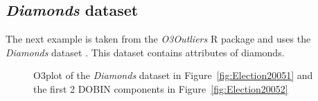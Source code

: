 \documentclass[a4paper,11pt]{article}
\begin{document}
\subsection{\textit{Diamonds} dataset}\label{sec:ResWithVis2}
The next example is taken from the \textit{O3Outliers} R package \citep{O3Rpack} and uses the \textit{Diamonds} dataset \citep{ggplot2}. This dataset contains attributes of diamonds.

\begin{figure}[!ht]
	\centering
	\caption{O3plot of the \textit{Diamonds} dataset in Figure~\ref{fig:Election20051} and the first 2 DOBIN components in Figure~\ref{fig:Election20052} }
	\label{fig:Diamonds}
\end{figure}
\end{document}
